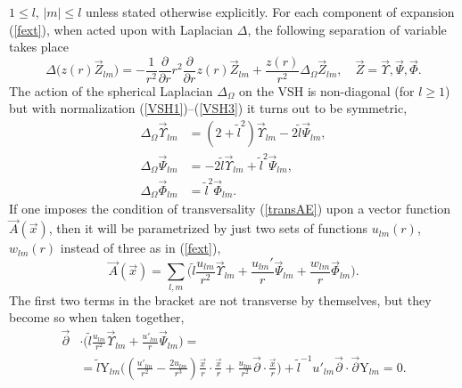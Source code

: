 \documentclass[12pt]{article}
\newcommand{\pl}{\partial}
\newcommand{\plr}{\partial r}
\newcommand{\Dtph}{\Delta_{\Omega}}
\newcommand{\YY}{\mathrm{Y}}
\begin{document}
$ 1 \leq l $, 
$ |m| \leq l $
	unless stated otherwise explicitly.
	For each component of expansion
(\ref{fext}),
	when acted upon with Laplacian
$ \Delta $,
	the following separation of variable takes place
\begin{equation*}
    \Delta \bigl(z(r) \vec{Z}_{lm}\bigr) =
-\frac{1}{r^{2}} \frac{\pl}{\plr} r^{2} \frac{\pl}{\plr} z(r) \vec{Z}_{lm}
        + \frac{z(r)}{r^{2}} \Dtph \vec{Z}_{lm}, \quad
            \vec{Z} = \vec{\Upsilon}, \vec{\Psi}, \vec{\Phi} .
\end{equation*}
	The action of the spherical Laplacian
$ \Dtph $
	on the VSH is non-diagonal (for
$ l \geq 1 $)
	but with normalization
(\ref{VSH1})--(\ref{VSH3})
	it turns out to be symmetric,
\begin{align*}
    \Dtph \vec{\Upsilon}_{lm} &= (2+\tilde{l}^{2}) \vec{\Upsilon}_{lm}
            - 2 \tilde{l} \vec{\Psi}_{lm} ,\\
                  \Dtph \vec{\Psi}_{lm} &= -2 \tilde{l}
\vec{\Upsilon}_{lm}
            + \tilde{l}^{2} \vec{\Psi}_{lm} ,\\
    \Dtph \vec{\Phi}_{lm} &= \tilde{l}^{2} \vec{\Phi}_{lm} .
\end{align*}
	If one imposes the condition of transversality
(\ref{transAE})
	upon a vector function
$ \vec{A}(\vec{x}) $,
	then it will be parametrized by just two sets of functions
$ u_{lm}(r) $,
$ w_{lm}(r) $
	instead of three as in 
(\ref{fext}),
\begin{equation}
\label{Atrexp}
    \vec{A}(\vec{x}) =
        \sum_{l,m} \bigl(\tilde{l}
	    \frac{u_{lm}}{r^{2}} \vec{\Upsilon}_{lm} +
        \frac{u_{lm}'}{r} \vec{\Psi}_{lm} 
    +   \frac{w_{lm}}{r} \vec{\Phi}_{lm} \bigr) .
\end{equation}
	The first two terms in the bracket are not transverse by themselves,
	but they become so when taken together,
\begin{align}
\label{treq}
    \vec{\pl} &\cdot
\bigl(\tilde{l}\frac{u_{lm}}{r^{2}}\vec{\Upsilon}_{lm}
        +\frac{u'_{lm}}{r}\vec{\Psi}_{lm}\bigr) =\\
\nonumber
    &= \tilde{l} \YY_{lm}
        \bigl( (\frac{u'_{lm}}{r^{2}}-\frac{2u_{lm}}{r^{3}})
        \frac{\vec{x}}{r}\cdot\frac{\vec{x}}{r} 
    + \frac{u_{lm}}{r^{2}} \vec{\pl}\cdot \frac{\vec{x}}{r} \bigr) 
    + \tilde{l}^{-1} u'_{lm} \vec{\pl}\cdot\vec{\pl} \YY_{lm} = 0 .
\end{align}
\end{document}
